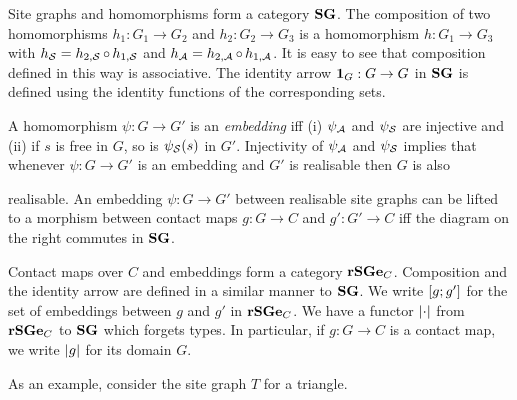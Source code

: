 Site graphs and homomorphisms form a category $\mathbf{SG}$.
The composition of two homomorphisms
$h_1: G_1 \to G_2$ and $h_2: G_2 \to G_3$
is a homomorphism $h: G_1 \to G_3$ with
$h_{\mathcal{S}} = h_{2,\mathcal{S}} \operatorname*{\circ} h_{1,\mathcal{S}}$ and
$h_{\mathcal{A}} = h_{2,\mathcal{A}} \operatorname*{\circ} h_{1,\mathcal{A}}$.
It is easy to see that composition defined in this way is associative.
The identity arrow $\boldsymbol{\mathbf{1}}_G: G \to G$ in $\mathbf{SG}$ is defined
using the identity functions of the corresponding sets.

A homomorphism $\psi: G \to G'$ is an \emph{embedding} iff
(i) $\psi_{\mathcal{A}}$ and $\psi_{\mathcal{S}}$ are injective and
(ii) if $s$ is free in $G$, so is $\psi_{\mathcal{S}}(s)$ in $G'$.
Injectivity of $\psi_{\mathcal{A}}$ and $\psi_{\mathcal{S}}$ implies that
whenever $\psi: G \to G'$ is an embedding and $G'$ is realisable
then $G$ is also
\begin{wrapfigure}[3]{r}{0.28\textwidth}
  \vspace{-1.5em}
  \begin{center}
  \end{center}
\end{wrapfigure}
realisable.
An embedding $\psi: G \to G'$ between realisable site graphs
can be lifted to a morphism between contact maps $g: G \to C$
and $g': G' \to C$ iff the diagram on the right commutes in $\mathbf{SG}$.

Contact maps over $C$ and embeddings form a category $\mathbf{rSGe}_C$.
Composition and the identity arrow
are defined in a similar manner to $\mathbf{SG}$.
We write $\left[g;g'\right]$ for the set of embeddings
between $g$ and $g'$ in $\mathbf{rSGe}_C$.
We have a functor $\left|\cdot\right|$
from $\mathbf{rSGe}_C$ to $\mathbf{SG}$ which forgets types.
In particular, if $g: G \to C$ is a contact map,
we write $\left|g\right|$ for its domain $G$.

As an example, consider the site graph $T$ for a triangle.

